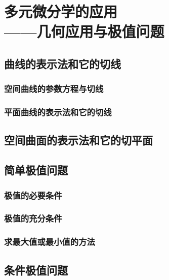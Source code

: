 

\chapter{多元微分学的应用\\——几何应用与极值问题}\label{ch:18}
\section{曲线的表示法和它的切线}
\subsection{空间曲线的参数方程与切线}
\subsection{平面曲线的表示法和它的切线}
\begin{exercise}
\item
\end{exercise}
\section{空间曲面的表示法和它的切平面}
\begin{exercise}
\item
\end{exercise}
\section{简单极值问题}
\subsection{极值的必要条件}
\subsection{极值的充分条件}
\subsection{求最大值或最小值的方法}
\begin{exercise}
\item
\end{exercise}
\section{条件极值问题}
